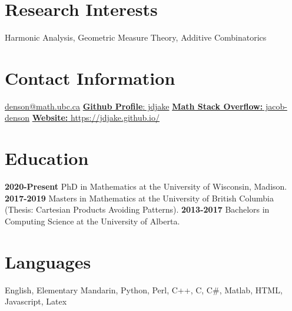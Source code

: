 \documentclass[a4paper]{cv-friggeri}
\begin{document}


\begin{aside} %
\section{Research Interests}
Harmonic Analysis, Geometric Measure Theory, Additive Combinatorics
~
\section{Contact Information}
\href{mailto:denson@math.ubc.ca}{denson@math.ubc.ca}
\href{https://github.com/jdjake}{{\bf Github Profile}: jdjake}
\href{https://math.stackexchange.com/users/120724/jacob-denson}{{\bf Math Stack Overflow:} jacob-denson}
\href{https://jdjake.github.io/}{{\bf Website:} https://jdjake.github.io/}
~
\section{Education}
{\bf 2020-Present}
PhD in Mathematics at the University of Wisconsin, Madison.
{\bf 2017-2019}
Masters in Mathematics at the University of British Columbia (Thesis: Cartesian Products Avoiding Patterns).
{\bf 2013-2017}
Bachelors in Computing Science at the University of Alberta.
\section{Languages}
English, Elementary Mandarin, Python, Perl, C++, C, C\#, Matlab, HTML, Javascript, Latex
\end{aside}
\end{document}
